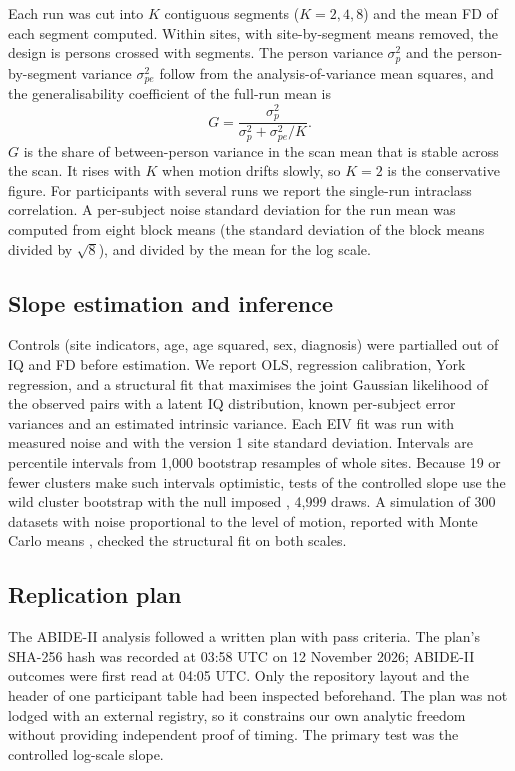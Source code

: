 \documentclass[11pt,a4paper]{article}
\begin{document}
Each run was cut into $K$ contiguous segments ($K = 2, 4, 8$) and the mean FD of each segment computed. Within sites, with site-by-segment means removed, the design is persons crossed with segments. The person variance $\sigma^2_p$ and the person-by-segment variance $\sigma^2_{pe}$ follow from the analysis-of-variance mean squares, and the generalisability coefficient of the full-run mean is
\begin{equation}
G = \frac{\sigma^2_p}{\sigma^2_p + \sigma^2_{pe}/K}.
\end{equation}
$G$ is the share of between-person variance in the scan mean that is stable across the scan. It rises with $K$ when motion drifts slowly, so $K = 2$ is the conservative figure. For participants with several runs we report the single-run intraclass correlation. A per-subject noise standard deviation for the run mean was computed from eight block means (the standard deviation of the block means divided by $\sqrt{8}$), and divided by the mean for the log scale.

\subsection{Slope estimation and inference}

Controls (site indicators, age, age squared, sex, diagnosis) were partialled out of IQ and FD before estimation. We report OLS, regression calibration, York regression, and a structural fit that maximises the joint Gaussian likelihood of the observed pairs with a latent IQ distribution, known per-subject error variances and an estimated intrinsic variance. Each EIV fit was run with measured noise and with the version 1 site standard deviation. Intervals are percentile intervals from 1,000 bootstrap resamples of whole sites. Because 19 or fewer clusters make such intervals optimistic, tests of the controlled slope use the wild cluster bootstrap with the null imposed \citep{Cameron2008}, 4,999 draws. A simulation of 300 datasets with noise proportional to the level of motion, reported with Monte Carlo means \citep{Morris2019}, checked the structural fit on both scales.

\subsection{Replication plan}

The ABIDE-II analysis followed a written plan with pass criteria. The plan's SHA-256 hash was recorded at 03:58 UTC on 12 November 2026; ABIDE-II outcomes were first read at 04:05 UTC. Only the repository layout and the header of one participant table had been inspected beforehand. The plan was not lodged with an external registry, so it constrains our own analytic freedom without providing independent proof of timing. The primary test was the controlled log-scale slope.
\end{document}
